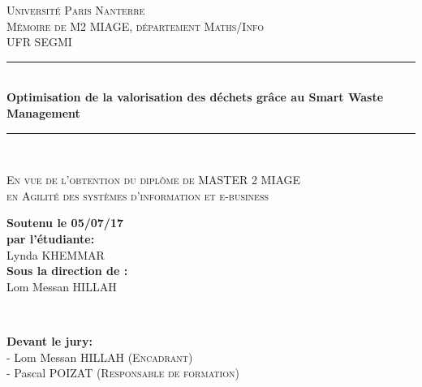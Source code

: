 \documentclass[a4paper,12pt]{report}
\begin{document}
\begin{titlepage}

\newcommand{\HRule}{\rule{\linewidth}{0.5mm}} %

\center %
 

\textsc{\Large Université Paris Nanterre}\\[2.5cm] %
\textsc{\large Mémoire de M2 MIAGE, département Maths/Info \\ UFR SEGMI}\\[0.5cm] %


\HRule \\[0.4cm]
{\Large \bfseries Optimisation de la valorisation des déchets grâce au Smart Waste Management}\\[0.4cm] %
\HRule \\[1.5cm]

\begin{center}
\textsc{En vue de l'obtention du diplôme de MASTER 2 MIAGE \\en Agilité des systèmes d'information et e-business}\\[2.5cm]
\end{center}
\begin{minipage}{0.4\textwidth}
\begin{flushleft}
\textbf{Soutenu le 05/07/17 \\par l'étudiante:}\\
Lynda \textsc{KHEMMAR}\\[0.5cm] %
\textbf{Sous la direction de :}\\
Lom Messan \textsc{HILLAH} %
\end{flushleft}
\end{minipage}
~
\begin{minipage}{0.4\textwidth}
\begin{flushright}
\textbf{Devant le jury:} \\
- Lom Messan \textsc{HILLAH (Encadrant)}\\ 
- Pascal \textsc{POIZAT (Responsable de formation)}\\
\end{flushright}
\end{minipage}\\[2cm]


\end{titlepage}
\end{document}
